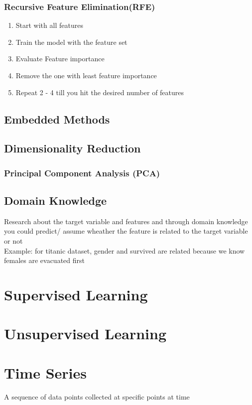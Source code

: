 \documentclass[12pt]{extarticle}
\begin{document}
\subsubsection{Recursive Feature Elimination(RFE)}
\begin{enumerate}
    \item Start with all features
    \item Train the model with the feature set
    \item Evaluate Feature importance
    \item Remove the one with least feature importance
    \item Repeat 2 - 4 till you hit the desired number of features
\end{enumerate}

\subsection{Embedded Methods}

\subsection{Dimensionality Reduction}
\subsubsection{Principal Component Analysis (PCA)}

\subsection{Domain Knowledge}
Research about the target variable and features and through domain
knowledge you could predict/ assume wheather the feature is related 
to the target variable or not \\
Example: for titanic dataset, gender and survived are related because
we know females are evacuated first

\section{Supervised Learning}
\section{Unsupervised Learning}

\section{Time Series}
A sequence of data points collected at specific points at time
\end{document}

